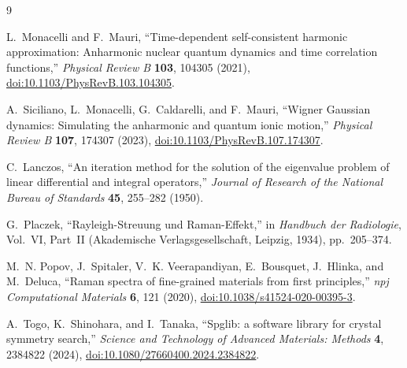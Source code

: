 \documentclass[11pt,a4paper]{article}
\begin{document}
\begin{thebibliography}{9}

L.~Monacelli and F.~Mauri,
``Time-dependent self-consistent harmonic approximation: Anharmonic nuclear
quantum dynamics and time correlation functions,''
\emph{Physical Review B} \textbf{103}, 104305 (2021),
\href{https://doi.org/10.1103/PhysRevB.103.104305}{doi:10.1103/PhysRevB.103.104305}.

A.~Siciliano, L.~Monacelli, G.~Caldarelli, and F.~Mauri,
``Wigner Gaussian dynamics: Simulating the anharmonic and quantum ionic
motion,'' \emph{Physical Review B} \textbf{107}, 174307 (2023),
\href{https://doi.org/10.1103/PhysRevB.107.174307}{doi:10.1103/PhysRevB.107.174307}.

C.~Lanczos, ``An iteration method for the solution of the eigenvalue problem
of linear differential and integral operators,''
\emph{Journal of Research of the National Bureau of Standards}
\textbf{45}, 255--282 (1950).

G.~Placzek, ``Rayleigh-Streuung und Raman-Effekt,'' in
\emph{Handbuch der Radiologie}, Vol.~VI, Part~II (Akademische
Verlagsgesellschaft, Leipzig, 1934), pp.~205--374.

M.~N. Popov, J.~Spitaler, V.~K. Veerapandiyan, E.~Bousquet, J.~Hlinka, and
M.~Deluca, ``Raman spectra of fine-grained materials from first principles,''
\emph{npj Computational Materials} \textbf{6}, 121 (2020),
\href{https://doi.org/10.1038/s41524-020-00395-3}{doi:10.1038/s41524-020-00395-3}.

A.~Togo, K.~Shinohara, and I.~Tanaka,
``Spglib: a software library for crystal symmetry search,''
\emph{Science and Technology of Advanced Materials: Methods}
\textbf{4}, 2384822 (2024),
\href{https://doi.org/10.1080/27660400.2024.2384822}{doi:10.1080/27660400.2024.2384822}.

\end{thebibliography}
\end{document}

